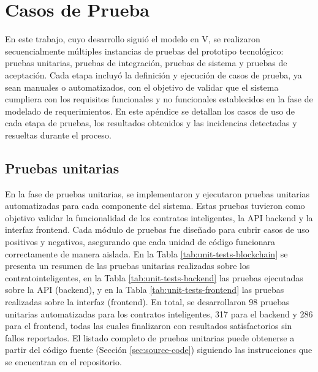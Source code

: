 \chapter[Casos de prueba]{Casos de Prueba}
\label{cp:tests-execution-results}

En este trabajo, cuyo desarrollo siguió el modelo en V, se realizaron secuencialmente múltiples instancias de pruebas del prototipo tecnológico: pruebas unitarias, pruebas de integración, pruebas de sistema y pruebas de aceptación. Cada etapa incluyó la definición y ejecución de casos de prueba, ya sean manuales o automatizados, con el objetivo de validar que el sistema cumpliera con los requisitos funcionales y no funcionales establecidos en la fase de modelado de requerimientos. En este apéndice se detallan los casos de uso de cada etapa de pruebas, los resultados obtenidos y las incidencias detectadas y resueltas durante el proceso.

\section{Pruebas unitarias}
\label{sec:unit-testing-details}

En la fase de pruebas unitarias, se implementaron y ejecutaron pruebas unitarias automatizadas para cada componente del sistema. Estas pruebas tuvieron como objetivo validar la funcionalidad de los contratos inteligentes, la API backend y la interfaz frontend. Cada módulo de pruebas fue diseñado para cubrir casos de uso positivos y negativos, asegurando que cada unidad de código funcionara correctamente de manera aislada. En la Tabla \ref{tab:unit-tests-blockchain} se presenta un resumen de las pruebas unitarias realizadas sobre los \glspl{contratointeligente}, en la Tabla \ref{tab:unit-tests-backend} las pruebas ejecutadas sobre la API (backend), y en la Tabla \ref{tab:unit-tests-frontend} las pruebas realizadas sobre la interfaz (\gls{frontend}). En total, se desarrollaron 98 pruebas unitarias automatizadas para los contratos inteligentes, 317 para el backend y 286 para el frontend, todas las cuales finalizaron con resultados satisfactorios sin fallos reportados. El listado completo de pruebas unitarias puede obtenerse a partir del código fuente (Sección \ref{sec:source-code}) siguiendo las instrucciones que se encuentran en el repositorio.


